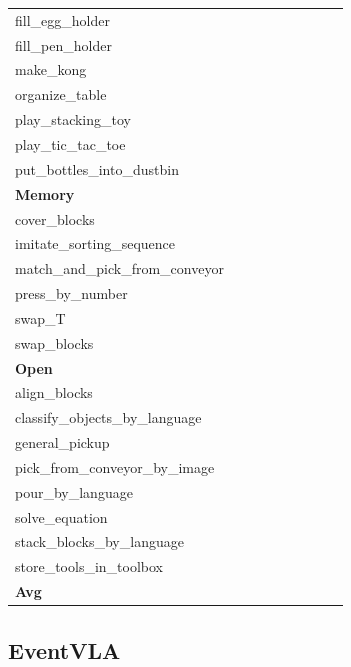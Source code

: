 \begin{table}[H]
{\begin{tabular}{l|c|c|c|c|c|c|c|c}
fill\_egg\_holder &  &  &  &  &  &  &  &  \\
fill\_pen\_holder &  &  &  &  &  &  &  &  \\
make\_kong &  &  &  &  &  &  &  &  \\
organize\_table &  &  &  &  &  &  &  &  \\
play\_stacking\_toy &  &  &  &  &  &  &  &  \\
play\_tic\_tac\_toe &  &  &  &  &  &  &  &  \\
put\_bottles\_into\_dustbin &  &  &  &  &  &  &  &  \\
\hline
\multicolumn{9}{l}{\textbf{Memory}} \\
cover\_blocks &  &  &  &  &  &  &  &  \\
imitate\_sorting\_sequence &  &  &  &  &  &  &  &  \\
match\_and\_pick\_from\_conveyor &  &  &  &  &  &  &  &  \\
press\_by\_number &  &  &  &  &  &  &  &  \\
swap\_T &  &  &  &  &  &  &  &  \\
swap\_blocks &  &  &  &  &  &  &  &  \\
\hline
\multicolumn{9}{l}{\textbf{Open}} \\
align\_blocks &  &  &  &  &  &  &  &  \\
classify\_objects\_by\_language &  &  &  &  &  &  &  &  \\
general\_pickup &  &  &  &  &  &  &  &  \\
pick\_from\_conveyor\_by\_image &  &  &  &  &  &  &  &  \\
pour\_by\_language &  &  &  &  &  &  &  &  \\
solve\_equation &  &  &  &  &  &  &  &  \\
stack\_blocks\_by\_language &  &  &  &  &  &  &  &  \\
store\_tools\_in\_toolbox &  &  &  &  &  &  &  &  \\
\hline
\textbf{Avg} &  &  &  &  &  &  &  &  \\
\hline
\end{tabular}
}
\end{table}
\subsection{EventVLA}
\label{part:eventvla}

